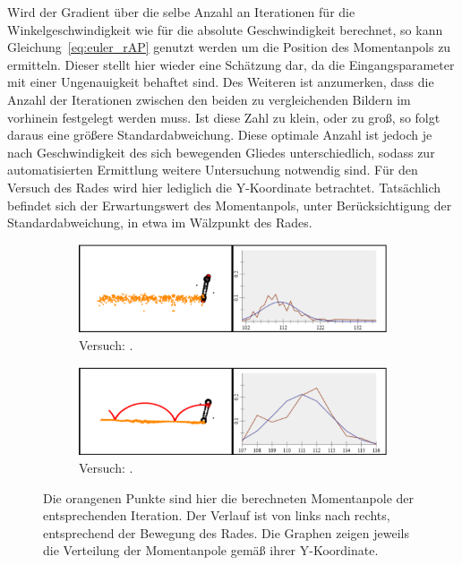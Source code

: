 Wird der Gradient über die selbe Anzahl an Iterationen für die Winkelgeschwindigkeit wie für die absolute Geschwindigkeit berechnet, so kann Gleichung~\ref{eq:euler_rAP} genutzt werden um die Position des Momentanpols zu ermitteln.
Dieser stellt hier wieder eine Schätzung dar, da die Eingangsparameter mit einer Ungenauigkeit behaftet sind.
Des Weiteren ist anzumerken, dass die Anzahl der Iterationen zwischen den beiden zu vergleichenden Bildern im vorhinein festgelegt werden muss.
Ist diese Zahl zu klein, oder zu groß, so folgt daraus eine größere Standardabweichung.
Diese optimale Anzahl ist jedoch je nach Geschwindigkeit des sich bewegenden Gliedes unterschiedlich, sodass zur automatisierten Ermittlung weitere Untersuchung notwendig sind.
Für den Versuch des Rades wird hier lediglich die Y-Koordinate betrachtet.
Tatsächlich befindet sich der Erwartungswert des Momentanpols, unter Berücksichtigung der Standardabweichung, in etwa im Wälzpunkt des Rades.

\begin{figure}
    \centering
    \begin{subfigure}[t]{0.45\textwidth}
        \includegraphics[width=\textwidth]{gfx/drehendes_rad_1.png}
        \caption{Versuch: .}\label{fig:drehendes_rad_1}
    \end{subfigure}
    \begin{subfigure}[t]{0.45\textwidth}
        \includegraphics[width=\textwidth]{gfx/drehendes_rad_4.png}
        \caption{Versuch: .}\label{fig:drehendes_rad_4}
    \end{subfigure}
    \caption{Die orangenen Punkte sind hier die berechneten Momentanpole der entsprechenden Iteration. Der Verlauf ist von links nach rechts, entsprechend der Bewegung des Rades. Die Graphen zeigen jeweils die Verteilung der Momentanpole gemäß ihrer Y-Koordinate.}
    \label{fig:drehendes_rad_1_4}
\end{figure}

